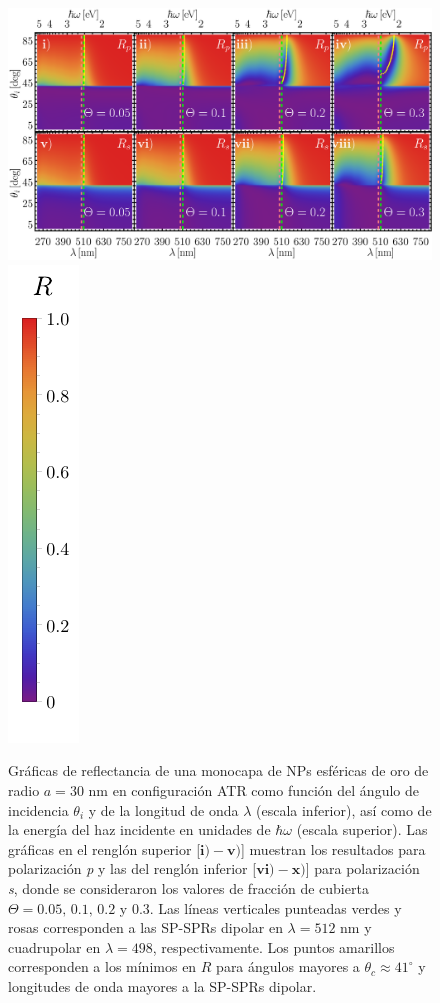	\begin{figure}[h!]\centering
\includegraphics[width = .76\linewidth]{2-Resultados/figs/6-AuThetaVar/0-2D_Grid}%
\includegraphics[scale=.89, trim={00 -5 00 00}, clip]{2-Resultados/figs/0-RBar_v}\vspace*{-.5em}
	\caption{Gráficas de reflectancia de una monocapa de NPs esféricas de oro de radio $a=30$ nm en configuración ATR como función del ángulo de incidencia $\theta_i$ y de la longitud de onda $\lambda$ (escala inferior), así como de la energía del haz incidente en unidades de $\hbar\omega$ (escala superior).  Las gráficas   en el renglón superior [$\mathbf{i)-v)}$] muestran los resultados para  polarización \emph{p} y las del renglón inferior  [$\mathbf{vi)-x)}$]  para polarización  \emph{s}, donde se consideraron los valores de fracción de cubierta $\Theta = 0.05,\,0.1,\,0.2$ y $0.3$.  Las líneas verticales punteadas verdes y rosas corresponden a las SP-SPRs dipolar en $\lambda=512$ nm y  cuadrupolar en $\lambda=498$, respectivamente.  Los puntos amarillos corresponden a los mínimos en $R$ para ángulos mayores a $\theta_c\approx 41^\circ$ y longitudes de onda mayores a la SP-SPRs dipolar.
}	\label{fig:Au-R-Theta}	
	\end{figure}	


